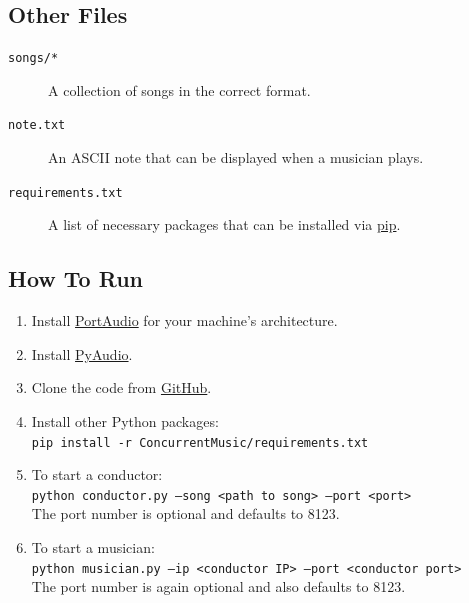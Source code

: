 \documentclass[12pt, letterpaper]{article}
\begin{document}
\subsection{Other Files}
\begin{description}
\item[\texttt{songs/*}] A collection of songs in the correct format.
\item[\texttt{note.txt}] An ASCII note that can be displayed when a musician plays.
\item[\texttt{requirements.txt}] A list of necessary packages that can be installed via
\href{https://pypi.python.org/pypi/pip}{pip}.
\end{description}

\subsection{How To Run}
\begin{enumerate}
\item Install \href{http://www.portaudio.com/}{PortAudio} for your machine's architecture.
\item Install \href{http://people.csail.mit.edu/hubert/pyaudio/}{PyAudio}.
\item Clone the code from \href{https://github.com/TylerLubeck/ConcurrentMusic}{GitHub}.
\item Install other Python packages:\\
\texttt{pip install -r ConcurrentMusic/requirements.txt}
\item To start a conductor:\\
\texttt{python conductor.py --song <path to song> --port <port>}\\
The port number is optional and defaults to 8123.
\item To start a musician:\\
\texttt{python musician.py --ip <conductor IP> --port <conductor port>}\\
The port number is again optional and also defaults to 8123.
\end{enumerate}
\end{document}
